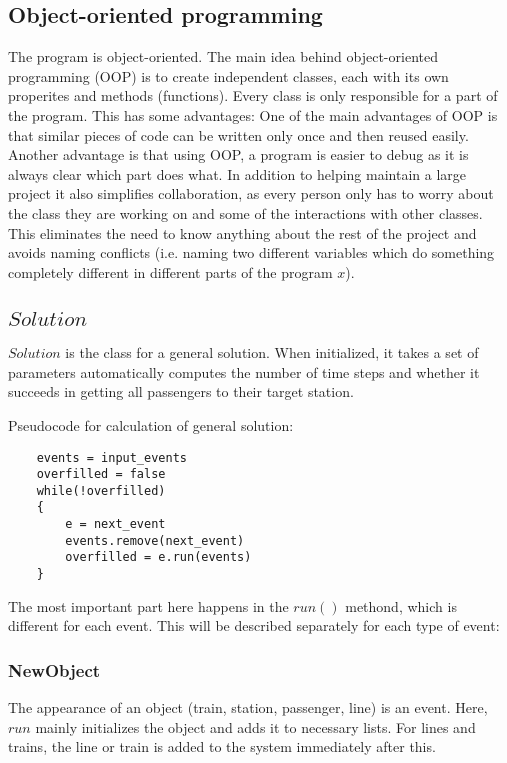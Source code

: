 \documentclass[10pt]{report}
\begin{document}
\subsection{Object-oriented programming}
The program is object-oriented. The main idea behind object-oriented programming (OOP) is to create independent classes, each with its own properites and methods (functions). Every class is only responsible for a part of the program. This has some advantages: One of the main advantages of OOP is that similar pieces of code can be written only once and then reused easily. Another advantage is that using OOP, a program is easier to debug as it is always clear which part does what. In addition to helping maintain a large project it also simplifies collaboration, as every person only has to worry about the class they are working on and some of the interactions with other classes. This eliminates the need to know anything about the rest of the project and avoids naming conflicts (i.e. naming two different variables which do something completely different in different parts of the program $x$). 

\subsection{$Solution$}
$Solution$ is the class for a general solution. When initialized, it takes a set of parameters automatically computes the number of time steps and whether it succeeds in getting all passengers to their target station.

Pseudocode for calculation of general solution: 
\lstset {language=C++}
\begin{lstlisting}
    events = input_events
    overfilled = false
    while(!overfilled)
    {   
        e = next_event
        events.remove(next_event)
        overfilled = e.run(events)
    }
\end{lstlisting}

The most important part here happens in the $run()$ methond, which is different for each event. This will be described separately for each type of event:

\subsubsection{NewObject}
The appearance of an object (train, station, passenger, line) is an event. Here, $run$ mainly initializes the object and adds it to necessary lists. For lines and trains, the line or train is added to the system immediately after this.
\end{document}
